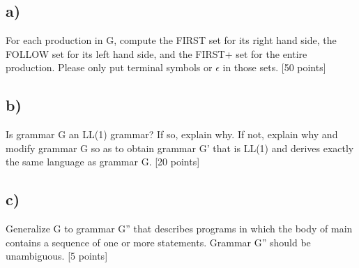 \documentclass{article}
\begin{document}
\subsection*{a)}
For each production in G, compute the FIRST set for its right hand side,
the FOLLOW set for its left hand side, and the FIRST+ set for the entire
production. Please only put terminal symbols or $\epsilon$ in those sets. [50 points]

\subsection*{b)}
Is grammar G an LL(1) grammar? If so, explain why. If not, explain why and
modify grammar G so as to obtain grammar G' that is LL(1) and derives
exactly the same language as grammar G. [20 points]

\subsection*{c)}
Generalize G to grammar G'' that describes programs in which the body of
main contains a sequence of one or more statements. Grammar G'' should 
be unambiguous. [5 points]
\end{document}
